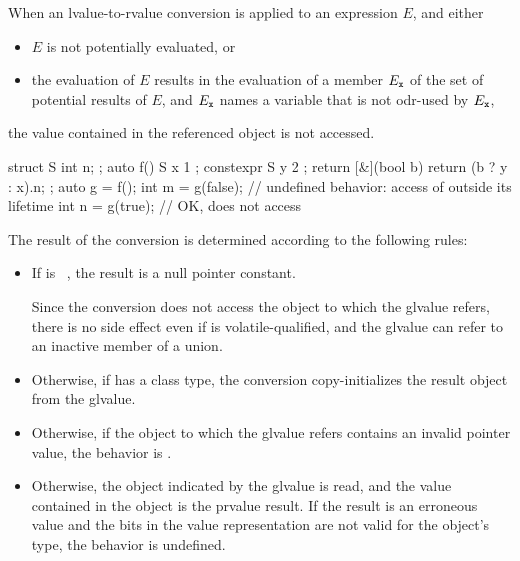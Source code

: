 \pnum
When an lvalue-to-rvalue conversion
is applied to an expression $E$, and either
\begin{itemize}
\item $E$ is not potentially evaluated, or
\item the evaluation of $E$ results in the evaluation of a member
      $E_{\texttt{\protect x}}$ of the set of potential results of $E$, and $E_{\texttt{\protect x}}$
      names a variable  that is not odr-used by
      $E_{\texttt{\protect x}}$,
\end{itemize}
the value contained in the referenced object is not accessed.
\begin{example}
\begin{codeblock}
struct S { int n; };
auto f() {
  S x { 1 };
  constexpr S y { 2 };
  return [&](bool b) { return (b ? y : x).n; };
}
auto g = f();
int m = g(false);   // undefined behavior: access of  outside its lifetime
int n = g(true);    // OK, does not access 
\end{codeblock}
\end{example}

\pnum
The result of the conversion is determined according to the
following rules:

\begin{itemize}

\item If  is \cv{}~, the result is a
null pointer constant.
\begin{note}
Since the conversion does not access the object to which the glvalue refers,
there is no side effect even if  is volatile-qualified, and
the glvalue can refer to an inactive member of a union.
\end{note}

\item Otherwise, if  has a class
type, the conversion copy-initializes the result object from
the glvalue.

\item Otherwise, if the object to which the glvalue refers contains an invalid
pointer value, the behavior is
.

\item Otherwise, the object indicated by the glvalue is read,
and the value contained in the object is the prvalue result.
If the result is an erroneous value and
the bits in the value representation are not valid for the object's type,
the behavior is undefined.
\end{itemize}


